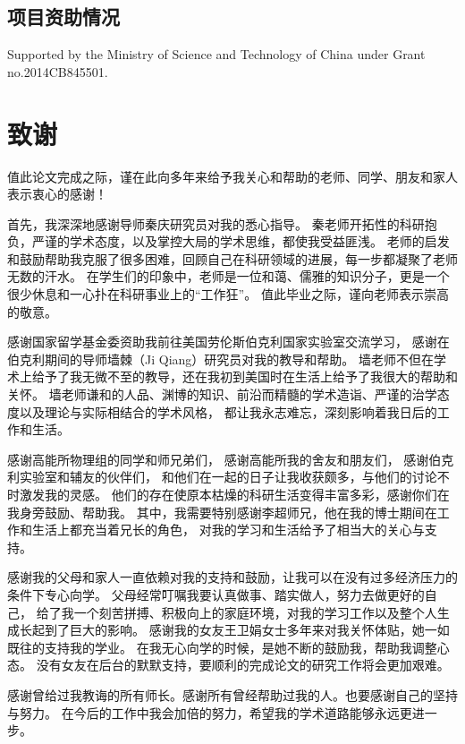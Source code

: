 \section*{项目资助情况}

Supported by the Ministry of Science and Technology of China under Grant no.2014CB845501.
\chapter{致\quad 谢}

值此论文完成之际，谨在此向多年来给予我关心和帮助的老师、同学、朋友和家人表示衷心的感谢！

首先，我深深地感谢导师秦庆研究员对我的悉心指导。
秦老师开拓性的科研抱负，严谨的学术态度，以及掌控大局的学术思维，都使我受益匪浅。
老师的启发和鼓励帮助我克服了很多困难，回顾自己在科研领域的进展，每一步都凝聚了老师无数的汗水。
在学生们的印象中，老师是一位和蔼、儒雅的知识分子，更是一个很少休息和一心扑在科研事业上的“工作狂”。
值此毕业之际，谨向老师表示崇高的敬意。

感谢国家留学基金委资助我前往美国劳伦斯伯克利国家实验室交流学习，
感谢在伯克利期间的导师墙棘（Ji Qiang）研究员对我的教导和帮助。
墙老师不但在学术上给予了我无微不至的教导，还在我初到美国时在生活上给予了我很大的帮助和关怀。
墙老师谦和的人品、渊博的知识、前沿而精髓的学术造诣、严谨的治学态度以及理论与实际相结合的学术风格，
都让我永志难忘，深刻影响着我日后的工作和生活。

感谢高能所物理组的同学和师兄弟们，
感谢高能所我的舍友和朋友们，
感谢伯克利实验室和辅友的伙伴们，
和他们在一起的日子让我收获颇多，与他们的讨论不时激发我的灵感。
他们的存在使原本枯燥的科研生活变得丰富多彩，感谢你们在我身旁鼓励、帮助我。
其中，我需要特别感谢李超师兄，他在我的博士期间在工作和生活上都充当着兄长的角色，
对我的学习和生活给予了相当大的关心与支持。

感谢我的父母和家人一直依赖对我的支持和鼓励，让我可以在没有过多经济压力的条件下专心向学。
父母经常叮嘱我要认真做事、踏实做人，努力去做更好的自己，
给了我一个刻苦拼搏、积极向上的家庭环境，对我的学习工作以及整个人生成长起到了巨大的影响。
感谢我的女友王卫娟女士多年来对我关怀体贴，她一如既往的支持我的学业。
在我无心向学的时候，是她不断的鼓励我，帮助我调整心态。
没有女友在后台的默默支持，要顺利的完成论文的研究工作将会更加艰难。

感谢曾给过我教诲的所有师长。感谢所有曾经帮助过我的人。也要感谢自己的坚持与努力。
在今后的工作中我会加倍的努力，希望我的学术道路能够永远更进一步。